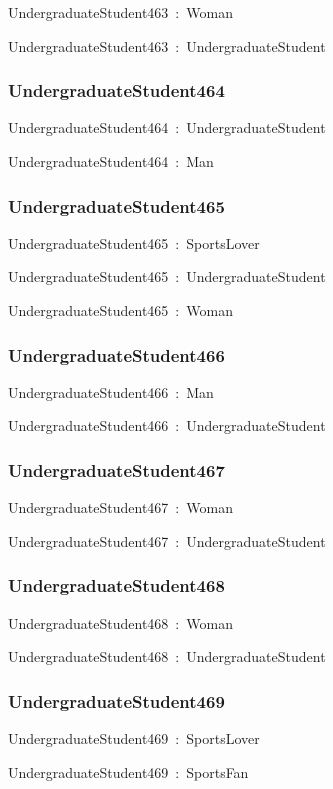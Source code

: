 \documentclass{article}
\begin{document}
UndergraduateStudent463~:~Woman

UndergraduateStudent463~:~UndergraduateStudent

\subsubsection*{UndergraduateStudent464}

UndergraduateStudent464~:~UndergraduateStudent

UndergraduateStudent464~:~Man

\subsubsection*{UndergraduateStudent465}

UndergraduateStudent465~:~SportsLover

UndergraduateStudent465~:~UndergraduateStudent

UndergraduateStudent465~:~Woman

\subsubsection*{UndergraduateStudent466}

UndergraduateStudent466~:~Man

UndergraduateStudent466~:~UndergraduateStudent

\subsubsection*{UndergraduateStudent467}

UndergraduateStudent467~:~Woman

UndergraduateStudent467~:~UndergraduateStudent

\subsubsection*{UndergraduateStudent468}

UndergraduateStudent468~:~Woman

UndergraduateStudent468~:~UndergraduateStudent

\subsubsection*{UndergraduateStudent469}

UndergraduateStudent469~:~SportsLover

UndergraduateStudent469~:~SportsFan
\end{document}
